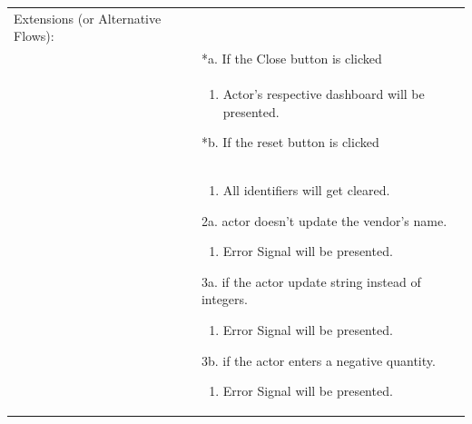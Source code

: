 \documentclass[12pt,a4paper]{article}
\begin{document}
\begin{longtable}{| p{3cm}|p{12cm}|}
Extensions (or Alternative Flows):\\
& *a. If the Close button is clicked \\
& \begin{enumerate}
		\item Actor's respective dashboard will be presented.
	\end{enumerate}
*b. If the reset button is clicked \\
&	\begin{enumerate}
		\item All identifiers will get cleared.
	\end{enumerate}
2a. actor doesn't update the vendor's name.
 	\begin{enumerate}
		\item Error Signal will be presented.
	\end{enumerate}
3a. if the actor update string instead of integers.
 	\begin{enumerate}
		\item Error Signal will be presented.
	\end{enumerate}
3b. if the actor enters a negative quantity.
 	\begin{enumerate}
		\item Error Signal will be presented.
	\end{enumerate}


\end{longtable}
\end{document}
